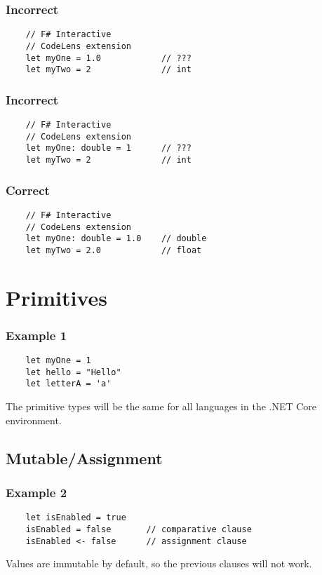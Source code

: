 \documentclass[a4paper,11pt]{article}
\begin{document}
\subsubsection*{Incorrect}
\lstset{language=FSharp}
\begin{lstlisting}
    // F# Interactive 
    // CodeLens extension
    let myOne = 1.0            // ???
    let myTwo = 2              // int
\end{lstlisting}
\subsubsection*{Incorrect}
\lstset{language=FSharp}
\begin{lstlisting}
    // F# Interactive 
    // CodeLens extension
    let myOne: double = 1      // ???
    let myTwo = 2              // int
\end{lstlisting}
\subsubsection*{Correct}
\lstset{language=FSharp}
\begin{lstlisting}
    // F# Interactive 
    // CodeLens extension
    let myOne: double = 1.0    // double 
    let myTwo = 2.0            // float
\end{lstlisting}



\section{Primitives}
\subsubsection*{Example 1}
\lstset{language=FSharp}
\begin{lstlisting}
    let myOne = 1
    let hello = "Hello"
    let letterA = 'a'
\end{lstlisting}
The primitive types will be the same for all languages in the .NET Core environment.
\subsection{Mutable/Assignment}
\subsubsection*{Example 2}
\begin{lstlisting}
    let isEnabled = true
    isEnabled = false       // comparative clause
    isEnabled <- false      // assignment clause
\end{lstlisting}
Values are immutable by default, so the previous clauses will not work.
\end{document}
